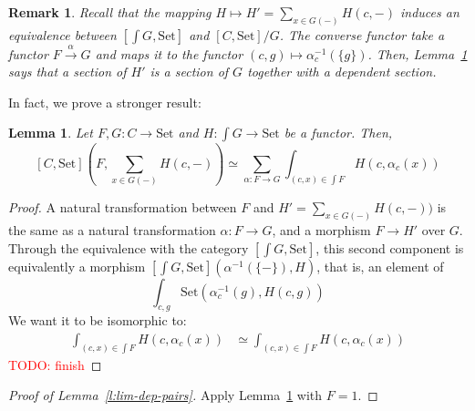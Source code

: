 \documentclass{article}
\newcommand{\Set}{\text{Set}}
\newtheorem{remark}[theorem]{Remark}
\newtheorem{lemma}[theorem]{Lemma}
\begin{document}
\begin{remark}
  Recall that the mapping $H \mapsto H'=\sum_{x\in G(-)} H(c,-)$ induces an
  equivalence between $[\int G, \Set]$ and $[C,\Set]/G$.
  The converse functor take a functor $F \xrightarrow{\alpha}{} G$ and maps it
  to the functor $(c,g)\mapsto \alpha^{-1}_c(\{g\})$.
    Then, Lemma~\ref{l:gen-lim-dep-pairs} says that a section of $H'$ is a
    section of $G$ together with a dependent section.
\end{remark}
In fact, we prove a stronger result:
\begin{lemma}
\label{l:gen-lim-dep-pairs}
  Let $F,G : C \rightarrow \Set$ and $H: \int G \rightarrow \Set$ be a functor.
  Then,
  \[
    [C,\Set](F, \sum_{x\in G(-)} H(c,-)) \simeq
    \sum_{\alpha : F \rightarrow G} \int_{(c,x)\in \int F} H(c, \alpha_c(x))
    \]
\end{lemma}
\begin{proof}
  A natural transformation between $F$ and
  $H'=\sum_{x\in G(-)} H(c,-))$ is the same as a natural transformation $\alpha:F
  \rightarrow G$, and a morphism $F \rightarrow H'$ over $G$.
  Through the equivalence with the category $[\int G, \Set]$, this second
  component is equivalently a morphism $[\int G, \Set](\alpha^{-1}(\{-\}), H)$,
  that is, an element of \[
    \int_{c,g}\Set (\alpha^{-1}_c(g),H(c,g))
  \]
  We want it to be isomorphic to:
  \begin{align*}
    \int_{(c,x)\in \int F} H(c, \alpha_c(x))
    & \simeq
      \int_{(c,x)\in \int F} H(c, \alpha_c(x))
  \end{align*}
  \textcolor{red}{TODO: finish}
\end{proof}
\begin{proof} [Proof of Lemma~\ref{l:lim-dep-pairs}]
 Apply Lemma~\ref{l:gen-lim-dep-pairs} with $F = 1$.
\end{proof}
\end{document}
